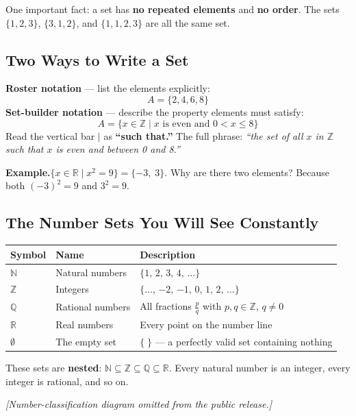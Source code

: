 \documentclass[12pt]{article}
\begin{document}
One important fact: a set has \textbf{no repeated elements} and \textbf{no order}.
The sets $\{1,2,3\}$, $\{3,1,2\}$, and $\{1,1,2,3\}$ are all the same set.

\bigskip
\subsection*{Two Ways to Write a Set}
\textbf{Roster notation} --- list the elements explicitly:
\[
  A = \{2, 4, 6, 8\}
\]
\textbf{Set-builder notation} --- describe the property elements must satisfy:
\[
  A = \{x \in \mathbb{Z} \mid x \text{ is even and } 0 < x \leq 8\}
\]
Read the vertical bar $\mid$ as \textbf{``such that.''} The full phrase:
\textit{``the set of all $x$ in $\mathbb{Z}$ such that $x$ is even and between 0 and 8.''}

\textbf{Example.}\quad $\{x \in \mathbb{R} \mid x^2 = 9\} = \{-3,\; 3\}$.
Why are there two elements? Because both $(-3)^2 = 9$ and $3^2 = 9$.

\newpage
\subsection*{The Number Sets You Will See Constantly}
\medskip
\renewcommand{\arraystretch}{1.6}
\begin{tabular}{@{} p{1.4cm} p{4.2cm} p{8cm} @{}}
\toprule
Symbol & Name & Description \\
\midrule
$\mathbb{N}$ & Natural numbers    & $\{1,\, 2,\, 3,\, 4,\, \ldots\}$ \\
$\mathbb{Z}$ & Integers           & $\{\ldots,\, {-2},\, {-1},\, 0,\, 1,\, 2,\, \ldots\}$ \\
$\mathbb{Q}$ & Rational numbers   & All fractions $\tfrac{p}{q}$ with $p,q \in \mathbb{Z}$, $q \neq 0$ \\
$\mathbb{R}$ & Real numbers       & Every point on the number line \\
$\emptyset$  & The empty set      & $\{\;\}$ --- a perfectly valid set containing nothing \\
\bottomrule
\end{tabular}
\renewcommand{\arraystretch}{1}

\medskip
These sets are \textbf{nested}:
$\mathbb{N} \subseteq \mathbb{Z} \subseteq \mathbb{Q} \subseteq \mathbb{R}$.
Every natural number is an integer, every integer is rational, and so on.

\medskip
\begin{center}
    \textit{[Number-classification diagram omitted from the public release.]}
\end{center}
\end{document}
